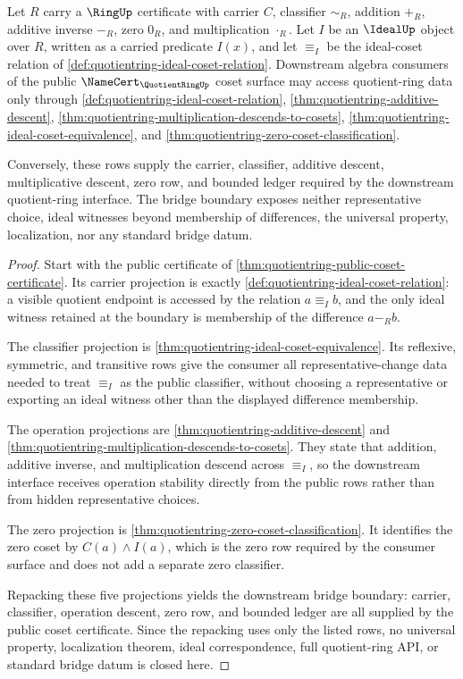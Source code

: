 \begin{theorem}
\label{thm:quotientring-public-coset-downstream-bridge}
Let $R$ carry a $\RingUp$ certificate with carrier $C$, classifier $\sim_R$, addition $+_R$, additive inverse $-_R$, zero $0_R$, and multiplication $\cdot_R$. Let $I$ be an $\IdealUp$ object over $R$, written as a carried predicate $I(x)$, and let $\equiv_I$ be the ideal-coset relation of \autoref{def:quotientring-ideal-coset-relation}. Downstream algebra consumers of the public $\NameCert_{\QuotientRingUp}$ coset surface may access quotient-ring data only through \autoref{def:quotientring-ideal-coset-relation}, \autoref{thm:quotientring-additive-descent}, \autoref{thm:quotientring-multiplication-descends-to-cosets}, \autoref{thm:quotientring-ideal-coset-equivalence}, and \autoref{thm:quotientring-zero-coset-classification}.

Conversely, these rows supply the carrier, classifier, additive descent, multiplicative descent, zero row, and bounded ledger required by the downstream quotient-ring interface. The bridge boundary exposes neither representative choice, ideal witnesses beyond membership of differences, the universal property, localization, nor any standard bridge datum.
\end{theorem}
\begin{proof}
Start with the public certificate of \autoref{thm:quotientring-public-coset-certificate}. Its carrier projection is exactly \autoref{def:quotientring-ideal-coset-relation}: a visible quotient endpoint is accessed by the relation $a\equiv_I b$, and the only ideal witness retained at the boundary is membership of the difference $a-_R b$.

The classifier projection is \autoref{thm:quotientring-ideal-coset-equivalence}. Its reflexive, symmetric, and transitive rows give the consumer all representative-change data needed to treat $\equiv_I$ as the public classifier, without choosing a representative or exporting an ideal witness other than the displayed difference membership.

The operation projections are \autoref{thm:quotientring-additive-descent} and \autoref{thm:quotientring-multiplication-descends-to-cosets}. They state that addition, additive inverse, and multiplication descend across $\equiv_I$, so the downstream interface receives operation stability directly from the public rows rather than from hidden representative choices.

The zero projection is \autoref{thm:quotientring-zero-coset-classification}. It identifies the zero coset by $C(a)\land I(a)$, which is the zero row required by the consumer surface and does not add a separate zero classifier.

Repacking these five projections yields the downstream bridge boundary: carrier, classifier, operation descent, zero row, and bounded ledger are all supplied by the public coset certificate. Since the repacking uses only the listed rows, no universal property, localization theorem, ideal correspondence, full quotient-ring API, or standard bridge datum is closed here.
\end{proof}

